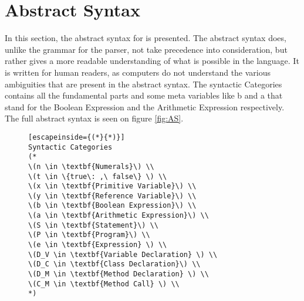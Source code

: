 \section{Abstract Syntax}
In this section, the abstract syntax for \lang{} is presented. The abstract syntax does, unlike the grammar for the parser, not take precedence into consideration, but rather gives a more readable understanding of what is possible in the language. It is written for human readers, as computers do not understand the various ambiguities that are present in the abstract syntax.
The syntactic Categories contains all the fundamental parts and some meta variables like b and a that stand for the Boolean Expression and the Arithmetic Expression respectively. The full abstract syntax is seen on figure \ref{fig:AS}.

\begin{figure}[H]
    \centering
    \begin{lstlisting}[escapeinside={(*}{*)}]
Syntactic Categories
(*
\(n \in \textbf{Numerals}\) \\
\(t \in \{true\: ,\ false\} \) \\
\(x \in \textbf{Primitive Variable}\) \\
\(y \in \textbf{Reference Variable}\) \\
\(b \in \textbf{Boolean Expression}\) \\
\(a \in \textbf{Arithmetic Expression}\) \\
\(S \in \textbf{Statement}\) \\
\(P \in \textbf{Program}\) \\
\(e \in \textbf{Expression} \) \\
\(D_V \in \textbf{Variable Declaration} \) \\
\(D_C \in \textbf{Class Declaration}\) \\
\(D_M \in \textbf{Method Declaration} \) \\
\(C_M \in \textbf{Method Call} \) \\
*)


\end{lstlisting}
\end{figure}
